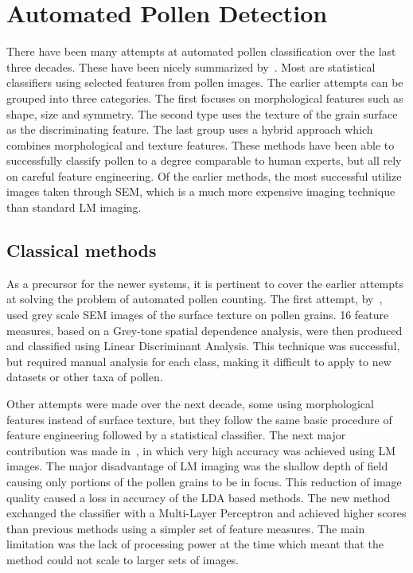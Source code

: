 \section{Automated Pollen Detection}\label{sec:rel-pollen}
There have been many attempts at automated pollen classification over the last three decades.
These have been nicely summarized by\ \textcite{sevillano_improving_2018}.
Most are statistical classifiers using selected features from pollen images.
The earlier attempts can be grouped into three categories.
The first focuses on morphological features such as shape, size and symmetry.
The second type uses the texture of the grain surface as the discriminating feature.
The last group uses a hybrid approach which combines morphological and texture features.
These methods have been able to successfully classify pollen to a degree comparable to human experts, but all rely on careful feature engineering.
Of the earlier methods, the most successful utilize images taken through SEM, which is a much more expensive imaging technique than standard LM imaging.

\subsection{Classical methods}
As a precursor for the newer systems, it is pertinent to cover the earlier attempts at solving the problem of automated pollen counting.
The first attempt, by\ \textcite{langford_computerized_1990}, used grey scale SEM images of the surface texture on pollen grains.
16 feature measures, based on a Grey-tone spatial dependence analysis, were then produced and classified using Linear Discriminant Analysis.
This technique was successful, but required manual analysis for each class, making it difficult to apply to new datasets or other taxa of pollen.

Other attempts were made over the next decade, some using morphological features instead of surface texture, but they follow the same basic procedure of feature engineering followed by a statistical classifier.
The next major contribution was made in\ \textcite{li_pollen_1999}, in which very high accuracy was achieved using LM images.
The major disadvantage of LM imaging was the shallow depth of field causing only portions of the pollen grains to be in focus.
This reduction of image quality caused a loss in accuracy of the LDA based methods.
The new method exchanged the classifier with a Multi-Layer Perceptron and achieved higher scores than previous methods using a simpler set of feature measures.
The main limitation was the lack of processing power at the time which meant that the method could not scale to larger sets of images.

